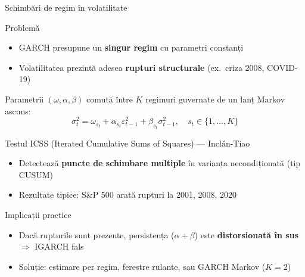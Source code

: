 \documentclass[9pt, aspectratio=169, t]{beamer}
\begin{document}
\begin{frame}{Schimbări de regim în volatilitate}
    \small
        \setlength{\abovedisplayskip}{1pt}\setlength{\belowdisplayskip}{1pt}
        \vspace{-0.4cm}
        \begin{block}{Problemă}
            \begin{itemize}
                \item GARCH presupune un \textbf{singur regim} cu parametri constanți
                \item Volatilitatea prezintă adesea \textbf{rupturi structurale} (ex.\ criza 2008, COVID-19)
            \end{itemize}
        \end{block}
        \vspace{-0.25cm}
        \begin{defn}
            Parametrii $(\omega, \alpha, \beta)$ comută între $K$ regimuri guvernate de un lanț Markov ascuns:
            \[
                \sigma_t^2 = \omega_{s_t} + \alpha_{s_t} \varepsilon_{t-1}^2 + \beta_{s_t} \sigma_{t-1}^2, \quad s_t \in \{1, \ldots, K\}
            \]
        \end{defn}
        \vspace{-0.25cm}
        \begin{exampleblock}{Testul ICSS (Iterated Cumulative Sums of Squares) --- Inclán-Tiao}
            \begin{itemize}
                \item Detectează \textbf{puncte de schimbare multiple} în varianța necondiționată (tip CUSUM)
                \item Rezultate tipice: S\&P 500 arată rupturi la 2001, 2008, 2020
            \end{itemize}
        \end{exampleblock}
        \vspace{-0.25cm}
        \begin{alertblock}{Implicații practice}
            \begin{itemize}\setlength{\itemsep}{-1pt}
                \item Dacă rupturile sunt prezente, persistența ($\alpha + \beta$) este \textbf{distorsionată în sus} $\Rightarrow$ IGARCH fals
                \item Soluție: estimare per regim, ferestre rulante, sau GARCH Markov ($K=2$)
            \end{itemize}
        \end{alertblock}
\end{frame}
\end{document}
